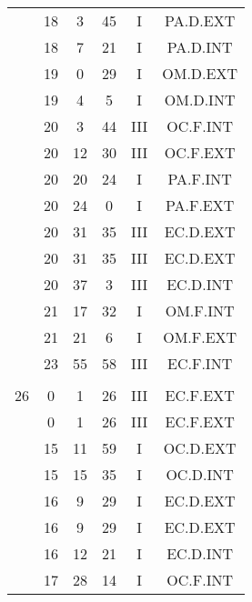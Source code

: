 \documentclass[12pt, a4paper]{article}
\begin{document}
\begin{multicols}{3}
{\begin{tabular}{c c c c c c}
	 	 	 	 & 18 & 3 & 45 & I & PA.D.EXT\\%
	 	 	 	 & 18 & 7 & 21 & I & PA.D.INT\\%
	 	 	 	 & 19 & 0 & 29 & I & OM.D.EXT\\%
	 	 	 	 & 19 & 4 & 5 & I & OM.D.INT\\%
	 	 	 	 & 20 & 3 & 44 & III & OC.F.INT\\%
	 	 	 	 & 20 & 12 & 30 & III & OC.F.EXT\\%
	 	 	 	 & 20 & 20 & 24 & I & PA.F.INT\\%
	 	 	 	 & 20 & 24 & 0 & I & PA.F.EXT\\%
	 	 	 	 & 20 & 31 & 35 & III & EC.D.EXT\\%
	 	 	 	 & 20 & 31 & 35 & III & EC.D.EXT\\%
	 	 	 	 & 20 & 37 & 3 & III & EC.D.INT\\%
	 	 	 	 & 21 & 17 & 32 & I & OM.F.INT\\%
	 	 	 	 & 21 & 21 & 6 & I & OM.F.EXT\\%
	 	 	 	 & 23 & 55 & 58 & III & EC.F.INT\\%
	 	 	 	 & & & & & \\%
	 	 	 	26 & 0 & 1 & 26 & III & EC.F.EXT\\%
	 	 	 	 & 0 & 1 & 26 & III & EC.F.EXT\\%
	 	 	 	 & 15 & 11 & 59 & I & OC.D.EXT\\%
	 	 	 	 & 15 & 15 & 35 & I & OC.D.INT\\%
	 	 	 	 & 16 & 9 & 29 & I & EC.D.EXT\\%
	 	 	 	 & 16 & 9 & 29 & I & EC.D.EXT\\%
	 	 	 	 & 16 & 12 & 21 & I & EC.D.INT\\%
	 	 	 	 & 17 & 28 & 14 & I & OC.F.INT\\%

\end{tabular}}
\end{multicols}
\end{document}
